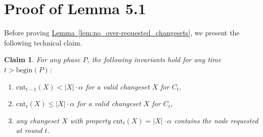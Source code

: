 \documentclass[sigconf,screen=true]{acmart}
\newtheorem{claim}[theorem]{Claim}
\newcommand{\lref}[2][]{\hyperref[#2]{#1~\ref*{#2}}}
\newcommand{\cnt}{\textrm{cnt}}
\newcommand{\beP}{\textrm{begin}(P)}
\begin{document}

\section{Proof of Lemma 5.1}
\label{sec:proof_of_lemma_1}

Before proving \lref[Lemma]{lem:no_over-requested_changesets}, 
we present the following technical claim.


\begin{claim}
\label{cla:inductive_properties}
For any phase $P$, the following invariants hold for any time $t > \beP$:
\begin{enumerate}
\item $\cnt_{t-1}(X) < |X| \cdot \alpha$ for a valid changeset $X$ for $C_t$,\hspace{-1em}
\label{item:prop1}
\item $\cnt_t(X) \leq |X| \cdot \alpha$ for a valid changeset $X$ for $C_t$,
\label{item:prop2}
\item any changeset $X$ with property $\cnt_t(X) = |X| \cdot \alpha$ contains 
the node requested at round $t$.
\label{item:propmid}
\end{enumerate}
\end{claim}
\end{document}
